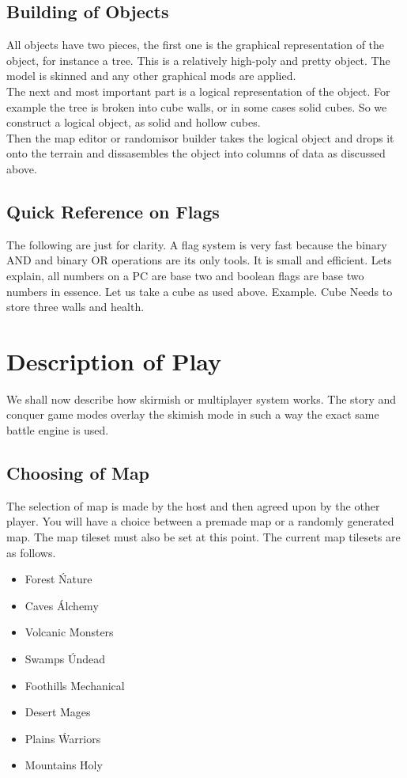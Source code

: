 \documentclass[a4paper]{article}
\begin{document}
\subsection{Building of Objects}

All objects have two pieces, the first one is the graphical representation of the object, for instance a tree. This is a relatively high-poly and pretty object. The model is skinned and any other graphical mods are applied.\\
The next and most important part is a logical representation of the object. For example the tree is broken into cube walls, or in some cases solid cubes. So we construct a logical object, as solid and hollow cubes.\\
Then the map editor or randomisor builder takes the logical object and drops it onto the terrain and dissasembles the object into columns of data as discussed above.

\subsection{Quick Reference on Flags}

The following are just for clarity. A flag system is very fast because the binary AND and binary OR operations are its only tools. It is small and efficient. Lets explain, all numbers on a PC are base two and boolean flags are base two numbers in essence. Let us take a cube as used above. Example.
Cube Needs to store three walls and health. 

\newpage \section{Description of Play}

We shall now describe how skirmish or multiplayer system works. The story and conquer game modes overlay the skimish mode in such a way the exact same battle engine is used.

\subsection{Choosing of Map}

The selection of map is made by the host and then agreed upon by the other player. You will have a choice between a premade map or a randomly generated map. The map tileset must also be set at this point. The current map tilesets are as follows.

\begin{itemize}
\item Forest		\' Nature
\item Caves			\' Alchemy
\item Volcanic		\' Monsters
\item Swamps		\' Undead
\item Foothills		\' Mechanical
\item Desert		\' Mages
\item Plains		\' Warriors
\item Mountains		\' Holy
\end{itemize}
\end{document}
